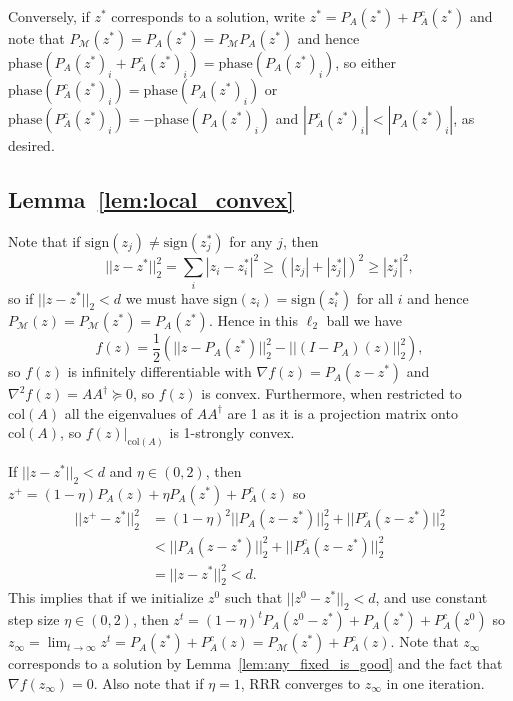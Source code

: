 \documentclass[12pt]{article}
\theoremstyle{definition}
\theoremstyle{remark}
\theoremstyle{definition}
\theoremstyle{problem}
\theoremstyle{definition}
\newcommand{\col}{\text{col}}
\newcommand{\sign}{\text{sign}}
\newcommand{\phase}{\text{phase}}
\newcommand{\MM}{\mathcal{M}}
\begin{document}
Conversely, if $z^*$ corresponds to a solution, write $z^* = P_A(z^*) + P_A^c(z^*)$ and note that $P_{\MM}(z^*) = P_A(z^*) = P_{\MM}P_A(z^*)$ and hence $\phase(P_A(z^*)_i + P_A^c(z^*)_i) = \phase(P_A(z^*)_i)$, so either $\phase(P_A^c(z^*)_i)=\phase(P_A(z^*)_i)$ or $\phase(P_A^c(z^*)_i)=-\phase(P_A(z^*)_i)$ and $|P_A^c(z^*)_i|<|P_A(z^*)_i|$, as desired.

\subsection{Lemma~\ref{lem:local_convex}}\label{sec:pf_local_convex}
Note that if $\sign(z_j)\neq \sign(z^*_j)$ for any $j$, then
\[ ||z-z^*||_2^2 = \sum_i|z_i-z^*_i|^2 \geq (|z_j| + |z^*_j|)^2 \geq |z^*_j|^2,\]
so if $||z-z^*||_2<d$ we must have $\sign(z_i)=\sign(z^*_i)$ for all $i$ and hence $P_{\MM}(z)=P_{\MM}(z^*)=P_A(z^*)$. Hence in this $\ell_2$ ball we have
\[ f(z) = \frac{1}{2}\left(||z-P_A(z^*)||_2^2 - ||(I-P_A)(z)||_2^2\right),\]
so $f(z)$ is infinitely differentiable with $\nabla f(z) = P_A(z-z^*)$ and $\nabla^2 f(z) = AA^{\dagger}\succeq 0$, so $f(z)$ is convex. Furthermore, when restricted to $\col(A)$ all the eigenvalues of $AA^{\dagger}$ are 1 as it is a projection matrix onto $\col(A)$, so $f(z)|_{\col(A)}$ is 1-strongly convex.

If $||z-z^*||_2<d$ and $\eta\in(0,2)$, then $z^+ = (1-\eta)P_A(z) + \eta P_A(z^*) + P_A^c(z)$ so
\[\begin{aligned} ||z^+-z^*||_2^2 &= (1-\eta)^2||P_A(z-z^*)||_2^2 + ||P_A^c(z-z^*)||_2^2\\
&< ||P_A(z-z^*)||_2^2 + ||P_A^c(z-z^*)||_2^2\\
&= ||z-z^*||_2^2 < d.\end{aligned}\]
This implies that if we initialize $z^0$ such that $||z^0-z^*||_2<d$, and use constant step size $\eta\in(0,2)$, then $z^t = (1-\eta)^tP_A(z^0-z^*) + P_A(z^*) + P_A^c(z^0)$ so $z_{\infty}=\lim_{t\to\infty}z^t = P_A(z^*) + P_A^c(z) = P_{\MM}(z^*) + P_A^c(z)$. Note that $z_{\infty}$ corresponds to a solution by Lemma~\ref{lem:any_fixed_is_good} and the fact that $\nabla f(z_{\infty}) = 0$. Also note that if $\eta = 1$, RRR converges to $z_{\infty}$ in one iteration.
\end{document}
